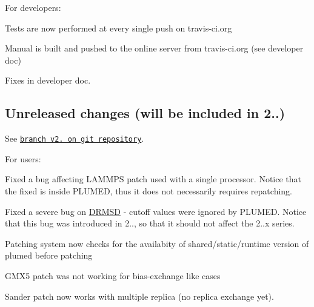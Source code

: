 For developers\+:
\begin{DoxyItemize}
\item Tests are now performed at every single push on travis-\/ci.\+org
\item Manual is built and pushed to the online server from travis-\/ci.\+org (see developer doc)
\item Fixes in developer doc.
\end{DoxyItemize}

\subsection*{Unreleased changes (will be included in 2..) }

See \href{http://github.com/plumed/plumed2/commits/v2.1}{\tt branch v2. on git repository}.

For users\+:
\begin{DoxyItemize}
\item Fixed a bug affecting L\+A\+M\+M\+P\+S patch used with a single processor. Notice that the fixed is inside P\+L\+U\+M\+E\+D, thus it does not necessarily requires repatching.
\item Fixed a severe bug on \hyperlink{DRMSD}{D\+R\+M\+S\+D} -\/ cutoff values were ignored by P\+L\+U\+M\+E\+D. Notice that this bug was introduced in 2.., so that it should not affect the 2..\+x series.
\item Patching system now checks for the availabity of shared/static/runtime version of plumed before patching
\item G\+M\+X5 patch was not working for bias-\/exchange like cases
\item Sander patch now works with multiple replica (no replica exchange yet). 
\end{DoxyItemize}